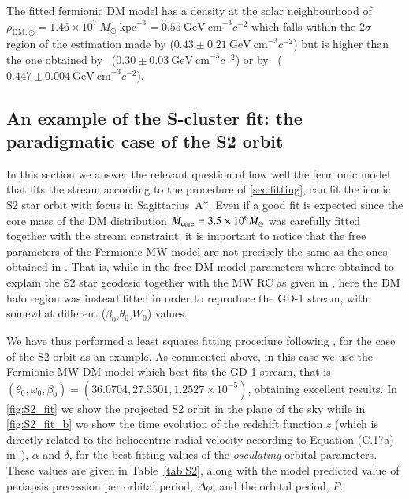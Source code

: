 \documentclass[twocolumn]{aa}
\begin{document}
The fitted fermionic DM model has a density at the solar neighbourhood of
$\rho_{\mathrm{DM},\odot}=1.46\times10^7~M_\odot~\mathrm{kpc}^{-3}=0.55~\mathrm{GeV~cm}^{-3} c^{-2}$ which falls within the $2\sigma$ region of the estimation made by \citealt{Salucci2010} ($0.43\pm 0.21~\mathrm{GeV~cm}^{-3} c^{-2}$)
but is higher than the one obtained by~\citealt{Eilers_2019} ($0.30\pm0.03~\mathrm{GeV~cm}^{-3} c^{-2}$) or by~\citealt{Ou_2024MNRAS} ($0.447\pm0.004~\mathrm{GeV~cm}^{-3} c^{-2}$).

\subsection{An example of the S-cluster fit: the paradigmatic case of the S2 orbit}
In this section we answer the relevant question of how well the fermionic model that fits the stream according to the procedure of \cref{sec:fitting}, can fit the iconic S2 star orbit with focus in Sagittarius~A*. Even if a good fit is expected since the core mass of the DM distribution $M_{\rm{core}}=3.5\times 10^6 M_\odot$ was carefully fitted together with the stream constraint, it is important to notice that the free parameters of the Fermionic-MW model are not precisely the same as the ones obtained in \cite{2020A&A...641A..34B}. That is, while in \cite{2020A&A...641A..34B} the free DM model parameters where obtained to explain the S2 star geodesic together with the MW RC as given in \cite{sofue_rotation_2013}, here the DM halo region was instead fitted in order to reproduce the GD-1 stream, with somewhat different ($\beta_0$,$\theta_0$,$W_0$) values. 

We have thus performed a least squares fitting procedure following \cite{2020A&A...641A..34B}, for the case of the S2 orbit as an example. As commented above, in this case we use the Fermionic-MW DM model which best fits the GD-1 stream, that is $(\theta_0, \omega_0, \beta_0)= (36.0704, 27.3501, 1.2527\times10^{-5})$, obtaining excellent results. In \cref{fig:S2_fit}  we show the projected S2 orbit in the plane of the sky while in \cref{fig:S2_fit_b} we show the time evolution of the redshift function $z$ (which is directly related to the heliocentric radial velocity according to Equation (C.17a) in~\citealp{2020A&A...641A..34B}), $\alpha$ and $\delta$, for the best fitting values of the \textit{osculating} orbital parameters. These values are given in Table~\ref{tab:S2}, along with the model predicted value of periapsis precession per orbital period, $\Delta \phi$, and the orbital period, $P$.
\end{document}
